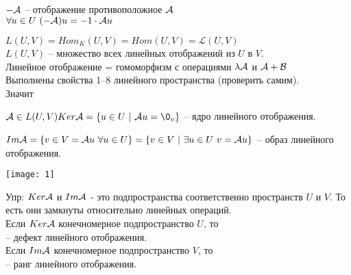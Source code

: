 \documentclass[../spring.tex]{subfiles}
\begin{document}
	\begin{defin}
		$-\mathcal{A}$ -- отображение противоположное $\mathcal{A}$\\
		$\forall u \in U \ (-\mathcal{A})u = -1 \cdot \mathcal{A} u$
	\end{defin}
	
	$L(U, V) = Hom_K(U, V) = Hom(U, V) = \mathcal{L}(U, V)$\\
	$L(U, V)$ -- множество всех линейных отображений из $U$ в $V$.\\
	Линейное отображение = гомоморфизм с операциями $\lambda \mathcal{A}$ и $\mathcal{A} + \mathcal{B}$\\
	Выполнены свойства 1--8 линейного пространства (проверить самим). \\Значит 
	\begin{defin}
		$\A \in L(U, V)\\
		Ker\A = \{u \in U \ | \ \A u = \0_v\}$ -- ядро линейного отображения. 
	\end{defin}
	\begin{defin}
		$Im\mathcal{A} =\{v \in V = \mathcal{A} u \ \forall u \in U\} = \\ \{v \in V \ | \  \exists u \in U \ v = \mathcal{A} u\}$ --
		образ линейного отображения.
	\end{defin}
	\texttt{[image: 1]}
	
	Упр: $Ker\mathcal{A}$ и $Im\mathcal{A}$ - это подпространства соответственно пространств $U$ и $V$. То есть они замкнуты относительно линейных операций. \\
	Если $Ker\mathcal{A}$ конечномерное подпространство $U$, то \\
	 -- дефект линейного отображения.\\
	Если $Im\mathcal{A}$ конечномерное подпространство $V$, то \\
	 -- ранг линейного отображения.
	
\end{document}
